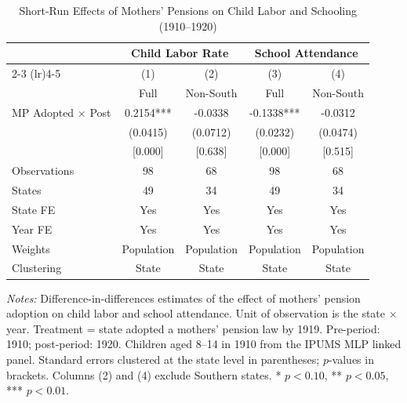 \begin{table}[H]
\centering
\caption{Short-Run Effects of Mothers' Pensions on Child Labor and Schooling (1910--1920)}
\begin{threeparttable}
\begin{tabular}{lcccc}
\toprule
 & \multicolumn{2}{c}{Child Labor Rate} & \multicolumn{2}{c}{School Attendance} \\
\cmidrule(lr){2-3} \cmidrule(lr){4-5}
 & (1) & (2) & (3) & (4) \\
 & Full & Non-South & Full & Non-South \\
\midrule
MP Adopted $\times$ Post & 0.2154*** & -0.0338 & -0.1338*** & -0.0312 \\
 & (0.0415) & (0.0712) & (0.0232) & (0.0474) \\
 & [0.000] & [0.638] & [0.000] & [0.515] \\[6pt]
Observations & 98 & 68 & 98 & 68 \\
States & 49 & 34 & 49 & 34 \\
State FE & Yes & Yes & Yes & Yes \\
Year FE & Yes & Yes & Yes & Yes \\
Weights & Population & Population & Population & Population \\
Clustering & State & State & State & State \\
\bottomrule
\end{tabular}
\begin{tablenotes}[flushleft]
\small
\item \textit{Notes:} Difference-in-differences estimates of the effect of mothers' pension adoption on child labor and school attendance. Unit of observation is the state $\times$ year. Treatment = state adopted a mothers' pension law by 1919. Pre-period: 1910; post-period: 1920. Children aged 8--14 in 1910 from the IPUMS MLP linked panel. Standard errors clustered at the state level in parentheses; $p$-values in brackets. Columns (2) and (4) exclude Southern states. * $p<0.10$, ** $p<0.05$, *** $p<0.01$.
\end{tablenotes}
\end{threeparttable}
\label{tab:short_run}
\end{table}
